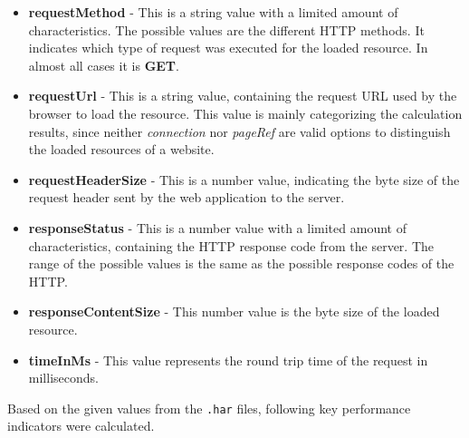 \begin{itemize}
	\item \textbf{requestMethod} - This is a string value with a limited amount of characteristics. The possible values are the different HTTP methods. It indicates which type of request was executed for the loaded resource. In almost all cases it is \textbf{GET}.
	
	\item \textbf{requestUrl} - This is a string value, containing the request URL used by the browser to load the resource. This value is mainly categorizing the calculation results, since neither \textit{connection} nor \textit{pageRef} are valid options to distinguish the loaded resources of a website. 
	
	\item \textbf{requestHeaderSize} - This is a number value, indicating the byte size of the request header sent by the web application to the server.
	
	\item \textbf{responseStatus} - This is a number value with a limited amount of characteristics, containing the HTTP response code from the server. The range of the possible values is the same as the possible response codes of the HTTP.
	
	\item \textbf{responseContentSize} - This number value is the byte size of the loaded resource.
	
	\item \textbf{timeInMs} - This value represents the round trip time of the request in milliseconds. 
\end{itemize}

Based on the given values from the \texttt{.har} files, following key performance indicators were calculated.

